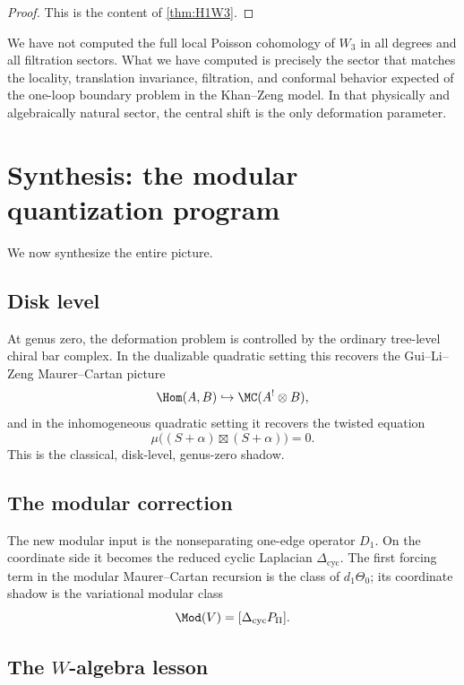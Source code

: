 \begin{proof}
This is the content of \cref{thm:H1W3}.
\end{proof}

\begin{remark}
We have not computed the full local Poisson cohomology of $W_3$ in all degrees and all
filtration sectors. What we have computed is precisely the sector that matches the locality,
translation invariance, filtration, and conformal behavior expected of the one-loop boundary
problem in the Khan--Zeng model. In that physically and algebraically natural sector, the
central shift is the only deformation parameter.
\end{remark}

\section{Synthesis: the modular quantization program}

We now synthesize the entire picture.

\subsection{Disk level}

At genus zero, the deformation problem is controlled by the ordinary tree-level chiral bar
complex. In the dualizable quadratic setting this recovers the Gui--Li--Zeng Maurer--Cartan
picture
\[
\Hom(A,B)\hookrightarrow \MC(A^!\otimes B),
\]
and in the inhomogeneous quadratic setting it recovers the twisted equation
\[
\mu\big((S+\alpha)\boxtimes(S+\alpha)\big)=0.
\]
This is the classical, disk-level, genus-zero shadow.

\subsection{The modular correction}

The new modular input is the nonseparating one-edge operator $D_1$. On the coordinate side
it becomes the reduced cyclic Laplacian $\Delta_{\mathrm{cyc}}$. The first forcing term in the
modular Maurer--Cartan recursion is the class of $d_1\Theta_0$; its coordinate shadow is the
variational modular class
\[
\Mod(V)=[\Delta_{\mathrm{cyc}}P_\Pi].
\]

\subsection{The $W$-algebra lesson}

